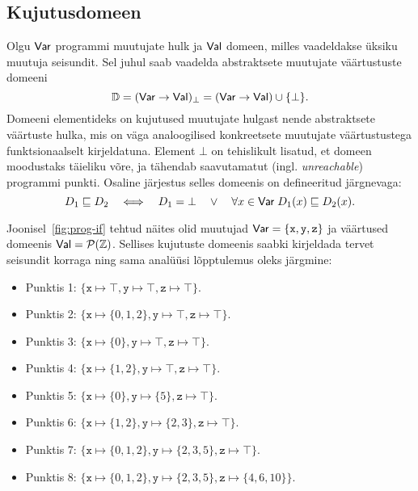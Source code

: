 \documentclass[../thesis.tex]{subfiles}
\begin{document}
\subsection{Kujutusdomeen}
Olgu $\mathsf{Var}$ programmi muutujate hulk ja $\mathsf{Val}$ domeen, milles vaadeldakse üksiku muutuja seisundit. Sel juhul saab vaadelda abstraktsete muutujate väärtustuste domeeni~\cite[45]{seidl_foundations}
\[
	\mathbb{D} = (\mathsf{Var} \to \mathsf{Val})_\bot = (\mathsf{Var} \to \mathsf{Val}) \cup \{\bot\}.
\]
Domeeni elementideks on kujutused muutujate hulgast nende abstraktsete väärtuste hulka, mis on väga analoogilised konkreetsete muutujate väärtustustega funktsionaalselt kirjeldatuna. Element $\bot$ on tehislikult lisatud, et domeen moodustaks täieliku võre, ja tähendab saavutamatut (ingl. \textit{unreachable}) programmi punkti. Osaline järjestus selles domeenis on defineeritud järgnevaga:
\[
	D_1 \sqsubseteq D_2 \quad\Longleftrightarrow\quad D_1 = \bot \quad\lor\quad \forall x \in \mathsf{Var}\; D_1(x) \sqsubseteq D_2(x).
\]

Joonisel~\ref{fig:prog-if} tehtud näites olid muutujad $\mathsf{Var} = \{\texttt{x}, \texttt{y}, \texttt{z}\}$ ja väärtused domeenis $\mathsf{Val} = \mathcal{P}(\mathbb{Z})$. Sellises kujutuste domeenis saabki kirjeldada tervet seisundit korraga ning sama analüüsi lõpptulemus oleks järgmine:
\begin{itemize}
	\item Punktis 1: $\{ \texttt{x} \mapsto \top, \texttt{y} \mapsto \top, \texttt{z} \mapsto \top \}$.
	\item Punktis 2: $\{ \texttt{x} \mapsto \{0, 1, 2\}, \texttt{y} \mapsto \top, \texttt{z} \mapsto \top \}$.
	\item Punktis 3: $\{ \texttt{x} \mapsto \{0\}, \texttt{y} \mapsto \top, \texttt{z} \mapsto \top \}$.
	\item Punktis 4: $\{ \texttt{x} \mapsto \{1, 2\}, \texttt{y} \mapsto \top, \texttt{z} \mapsto \top \}$.
	\item Punktis 5: $\{ \texttt{x} \mapsto \{0\}, \texttt{y} \mapsto \{5\}, \texttt{z} \mapsto \top \}$.
	\item Punktis 6: $\{ \texttt{x} \mapsto \{1, 2\}, \texttt{y} \mapsto \{2, 3\}, \texttt{z} \mapsto \top \}$.
	\item Punktis 7: $\{ \texttt{x} \mapsto \{0, 1, 2\}, \texttt{y} \mapsto \{2, 3, 5\}, \texttt{z} \mapsto \top \}$.
	\item Punktis 8: $\{ \texttt{x} \mapsto \{0, 1, 2\}, \texttt{y} \mapsto \{2, 3, 5\}, \texttt{z} \mapsto \{4, 6, 10\} \}$.
\end{itemize}
\end{document}
